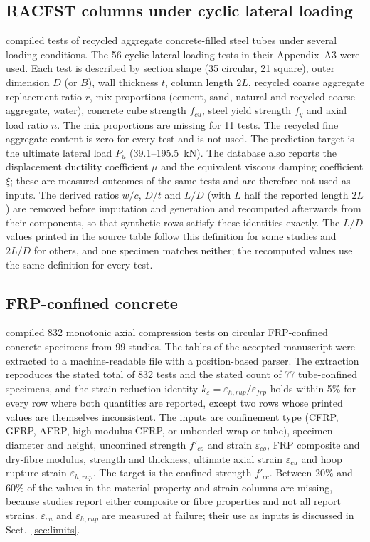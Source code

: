 \documentclass[pdflatex,sn-basic]{sn-jnl}
\begin{document}
\subsection{RACFST columns under cyclic lateral loading}
\citet{xu2020racfst} compiled tests of recycled aggregate concrete-filled steel tubes under several loading
conditions. The 56 cyclic lateral-loading tests in their Appendix~A3 were used. Each test is described by section
shape (35 circular, 21 square), outer dimension $D$ (or $B$), wall thickness $t$, column length $2L$, recycled
coarse aggregate replacement ratio $r$, mix proportions (cement, sand, natural and recycled coarse aggregate,
water), concrete cube strength $f_{cu}$, steel yield strength $f_y$ and axial load ratio $n$. The mix proportions
are missing for 11 tests. The recycled fine aggregate content is zero for every test and is not used. The prediction target is the ultimate lateral load $P_u$ (39.1--195.5~kN).
The database also reports the displacement ductility coefficient $\mu$ and the equivalent viscous damping
coefficient $\xi$; these are measured outcomes of the same tests and are therefore not used as inputs. The
derived ratios $w/c$, $D/t$ and $L/D$ (with $L$ half the reported length $2L$) are removed before imputation and
generation and recomputed afterwards from their components, so that synthetic rows satisfy these identities
exactly. The $L/D$ values printed in the source table follow this definition for some studies and $2L/D$ for
others, and one specimen matches neither; the recomputed values use the same definition for every test.

\subsection{FRP-confined concrete}
\citet{ozbakkaloglu2013database} compiled 832 monotonic axial compression tests on circular FRP-confined concrete
specimens from 99 studies. The tables of the accepted manuscript were extracted to a machine-readable file with a
position-based parser. The extraction reproduces the stated total of 832 tests and the stated count of 77
tube-confined specimens, and the strain-reduction identity $k_\varepsilon = \varepsilon_{h,rup} /
\varepsilon_{frp}$ holds within 5\% for every row where both quantities are reported, except two rows whose
printed values are themselves inconsistent. The inputs are confinement type (CFRP, GFRP, AFRP, high-modulus CFRP,
or unbonded wrap or tube), specimen diameter and height, unconfined strength $f'_{co}$ and strain
$\varepsilon_{co}$, FRP composite and dry-fibre modulus, strength and thickness, ultimate axial strain
$\varepsilon_{cu}$ and hoop rupture strain $\varepsilon_{h,rup}$. The target is the confined strength $f'_{cc}$.
Between 20\% and 60\% of the values in the material-property and strain columns are missing, because studies
report either composite or fibre properties and not all report strains. $\varepsilon_{cu}$ and
$\varepsilon_{h,rup}$ are measured at failure; their use as inputs is discussed in Sect.~\ref{sec:limits}.
\end{document}
